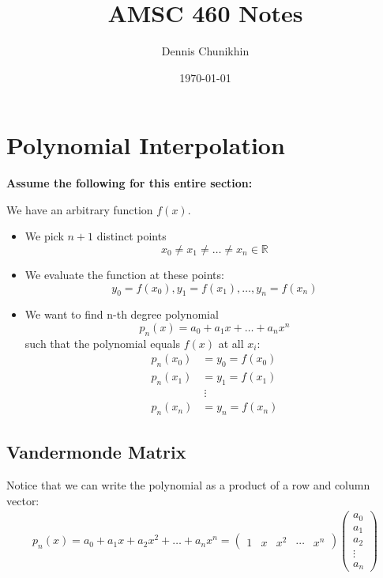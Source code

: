 \documentclass[12pt,letterpaper]{article}
\title{AMSC 460 Notes}
\author{Dennis Chunikhin}
\date{\today}
\newcommand{\R}{\mathbb{R}}
\begin{document}
\maketitle

\newpage
\tableofcontents
\newpage

\section{Polynomial Interpolation}

\textbf{Assume the following for this entire section:}

We have an arbitrary function $f(x)$.
\begin{itemize}
	\item We pick $n+1$ distinct points $$x_0 \neq x_1 \neq \dots \neq x_n \in \R$$
	\item We evaluate the function at these points: $$y_0 = f(x_0), y_1 = f(x_1), \dots, y_n = f(x_n)$$
	\item We want to find n-th degree polynomial $$p_n(x) = a_0 + a_1 x + \dots + a_n x^n$$
	such that the polynomial equals $f(x)$ at all $x_i$:
	\begin{align*}
		p_n(x_0)&=y_0 =f(x_0) \\ p_n(x_1) &= y_1 = f(x_1)  \\ &\ \vdots \\ p_n(x_n) &= y_n = f(x_n)
	\end{align*}
\end{itemize}

\subsection{Vandermonde Matrix}

Notice that we can write the polynomial as a product of a row and column vector:
\begin{align}
	p_n(x) = a_0 + a_1 x + a_2 x^2 + \dots + a_n x^n = \begin{pmatrix}
		1 & x & x^2 & \cdots & x^n
	\end{pmatrix} \begin{pmatrix}
		a_0 \\ a_1 \\ a_2 \\ \vdots \\ a_n
	\end{pmatrix} \label{eq:vandermonde_1}
\end{align}
\end{document}
